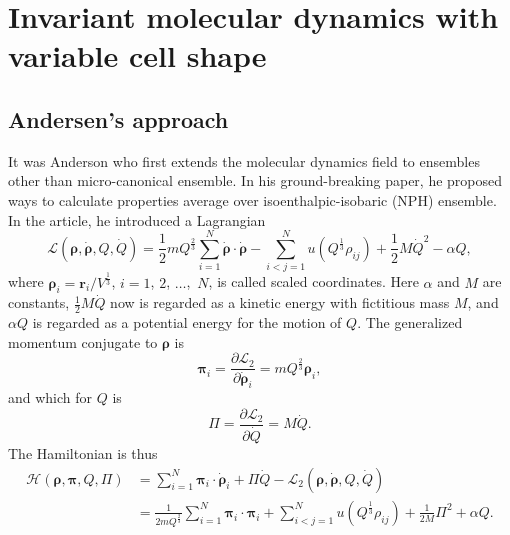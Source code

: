 
\section{Invariant molecular dynamics with variable cell shape}

\subsection{Andersen's approach}

It was Anderson who first extends the molecular dynamics field to
ensembles other than micro-canonical ensemble.\cite{Andersen:1980ew}
In his ground-breaking paper, he proposed ways to calculate properties average
over isoenthalpic-isobaric (NPH) ensemble. In the article, he introduced
a Lagrangian
\begin{equation}
	\mathcal{L}(\bm{\rho}, \dot{\bm{\rho}}, Q, \dot{ Q }) = \frac{ 1 }{ 2 } m
	Q^{\frac{ 2 }{ 3 }}
	\sum_{i=1}^{N} \dot{ \bm{\rho} } \cdot \dot{ \bm{\rho} } - \sum_{i<j=1}^{N}
	u (Q^{\frac{ 1 }{ 3 }} \rho_{ij}) + \frac{ 1 }{ 2 } M \dot{ Q } ^2 - \alpha Q,
\end{equation}
where $\bm{\rho}_i = \bm{r}_i / V ^{\frac{ 1 }{ 3 }}$, $i=1$, $2$, $\ldots$,~$N$,
is called scaled coordinates. Here $\alpha$ and $M$ are constants,
$\frac{ 1 }{ 2 } M \dot{ Q }$ now is regarded as a kinetic energy with fictitious
mass $M$,
and $\alpha Q$ is regarded as a potential energy for the motion of $Q$.
The generalized momentum conjugate to $\bm{\rho}$ is
\begin{equation}
	\bm{\pi}_i = \frac{ \partial \mathcal{L}_2 }{ \partial \dot{ \bm{\rho} }_i } =
	m Q^{\frac{ 2 }{ 3 }} \bm{\rho}_i,
\end{equation}
and which for $Q$ is
\begin{equation}
	\Pi = \frac{ \partial \mathcal{L}_2 }{ \partial \dot{Q} } = M \dot{ Q }.
\end{equation}
The Hamiltonian is thus
\begin{equation}
	\begin{split}
		\mathcal{H}(\bm{\rho}, \bm{\pi}, Q, \Pi) &= \sum_{i=1}^{N} \bm{\pi}_i \cdot
		\dot{ \bm{\rho} }_i + \Pi \dot{ Q } - \mathcal{L}_2
		(\bm{\rho}, \dot{\bm{\rho}}, Q, \dot{ Q })\\
		&= \frac{ 1 }{ 2 m Q^{\frac{ 2 }{ 3 }} }
		\sum_{i=1}^{N} \bm{\pi}_i \cdot \bm{\pi}_i
		+ \sum_{i<j=1}^{N} u(Q^{\frac{ 1 }{ 3 }} \rho_{ij}) + \frac{ 1 }{ 2 M }
		\Pi^2 + \alpha Q.
	\end{split}
\end{equation}
